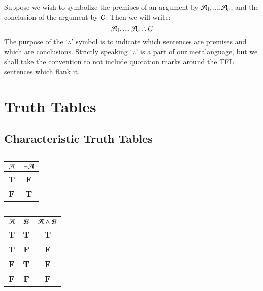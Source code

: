 \documentclass[12pt, a4paper, twoside, openright, titlepage]{book}
\begin{document}
\begin{defn}{}{}
    Suppose we wish to symbolize the premises of an argument by $\mathcal{A}_1,...,\mathcal{A}_n$, and the conclusion of the argument by $\mathcal{C}$. Then we will write:\begin{equation}
        \metav{A}_1,...,\metav{A}_n \therefore \metav{C}
    \end{equation}
    The purpose of the `$\therefore$' symbol is to indicate which sentences are premises and which are conclusions. Strictly speaking `$\therefore$' is a part of our metalanguage, but we shall take the convention to not include quotation marks around the TFL sentences which flank it.
\end{defn}





\chapter{\textsection\textsection Truth Tables}

\section{\textsection Characteristic Truth Tables}


\begin{table}[H]
    \centering
    \caption{}
    \begin{tabular}{c|c}
        $\mathcal{A}$ & $\lnot \mathcal{A}$ \\ \hline
        \textbf{T} & \textbf{F} \\
        \textbf{F} & \textbf{T}
    \end{tabular}
\end{table}


\begin{table}[H]
    \centering
    \caption{}
    \begin{tabular}{cc|c}
        $\mathcal{A}$ & $\mathcal{B}$ & $\mathcal{A} \wedge \mathcal{B}$\\ \hline
        \textbf{T} & \textbf{T} & \textbf{T} \\
        \textbf{T} & \textbf{F} & \textbf{F} \\
        \textbf{F} & \textbf{T} & \textbf{F} \\
        \textbf{F} & \textbf{F} & \textbf{F}
    \end{tabular}
\end{table}
\end{document}
